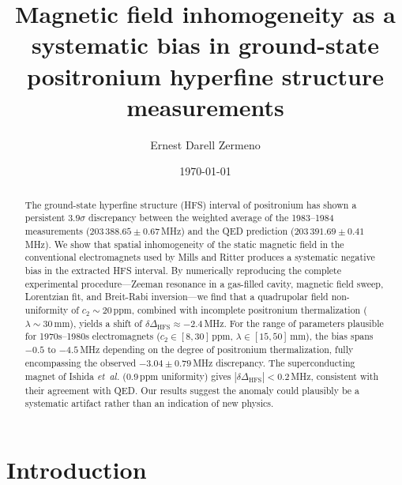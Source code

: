 \documentclass[twocolumn,pra,aps,superscriptaddress,floatfix,10pt]{revtex4-2}
\begin{document}
\title{Magnetic field inhomogeneity as a systematic bias in ground-state positronium hyperfine structure measurements}

\author{Ernest Darell Zermeno}

\date{\today}

\begin{abstract}
The ground-state hyperfine structure (HFS) interval of positronium has shown a persistent $3.9\sigma$ discrepancy between the weighted average of the 1983--1984 measurements ($203\,388.65 \pm 0.67$\,MHz) and the QED prediction ($203\,391.69 \pm 0.41$\,MHz). We show that spatial inhomogeneity of the static magnetic field in the conventional electromagnets used by Mills and Ritter produces a systematic negative bias in the extracted HFS interval. By numerically reproducing the complete experimental procedure---Zeeman resonance in a gas-filled cavity, magnetic field sweep, Lorentzian fit, and Breit-Rabi inversion---we find that a quadrupolar field non-uniformity of $c_2 \sim 20$\,ppm, combined with incomplete positronium thermalization ($\lambda \sim 30$\,mm), yields a shift of $\delta\Delta_\mathrm{HFS} \approx -2.4$\,MHz. For the range of parameters plausible for 1970s--1980s electromagnets ($c_2 \in [8, 30]$\,ppm, $\lambda \in [15, 50]$\,mm), the bias spans $-0.5$ to $-4.5$\,MHz depending on the degree of positronium thermalization, fully encompassing the observed $-3.04 \pm 0.79$\,MHz discrepancy. The superconducting magnet of Ishida \textit{et~al.} (0.9\,ppm uniformity) gives $|\delta\Delta_\mathrm{HFS}| < 0.2$\,MHz, consistent with their agreement with QED. Our results suggest the anomaly could plausibly be a systematic artifact rather than an indication of new physics.
\end{abstract}

\maketitle

\section{Introduction}
\label{sec:intro}
\end{document}
